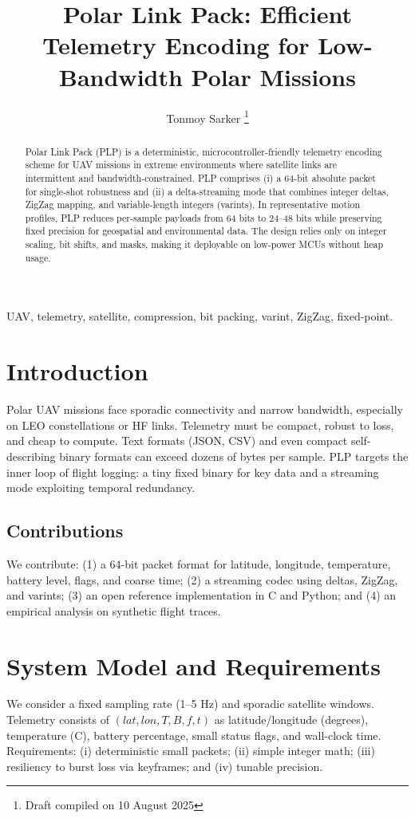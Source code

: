 \documentclass[conference]{IEEEtran}
\title{Polar Link Pack: Efficient Telemetry Encoding for Low-Bandwidth Polar Missions}
\author{Tonmoy Sarker \thanks{Draft compiled on 10 August 2025}}
\begin{document}
\maketitle
\begin{abstract}
Polar Link Pack (PLP) is a deterministic, microcontroller-friendly telemetry encoding scheme for UAV missions in extreme environments where satellite links are intermittent and bandwidth-constrained. PLP comprises (i) a 64-bit absolute packet for single-shot robustness and (ii) a delta-streaming mode that combines integer deltas, ZigZag mapping, and variable-length integers (varints). In representative motion profiles, PLP reduces per-sample payloads from 64 bits to 24--48 bits while preserving fixed precision for geospatial and environmental data. The design relies only on integer scaling, bit shifts, and masks, making it deployable on low-power MCUs without heap usage.
\end{abstract}
\begin{IEEEkeywords}
UAV, telemetry, satellite, compression, bit packing, varint, ZigZag, fixed-point.
\end{IEEEkeywords}
\section{Introduction}
Polar UAV missions face sporadic connectivity and narrow bandwidth, especially on LEO constellations or HF links. Telemetry must be compact, robust to loss, and cheap to compute. Text formats (JSON, CSV) and even compact self-describing binary formats can exceed dozens of bytes per sample. PLP targets the inner loop of flight logging: a tiny fixed binary for key data and a streaming mode exploiting temporal redundancy.
\subsection{Contributions}
We contribute: (1) a 64-bit packet format for latitude, longitude, temperature, battery level, flags, and coarse time; (2) a streaming codec using deltas, ZigZag, and varints; (3) an open reference implementation in C and Python; and (4) an empirical analysis on synthetic flight traces.
\section{System Model and Requirements}
We consider a fixed sampling rate (1--5 Hz) and sporadic satellite windows. Telemetry consists of $(lat, lon, T, B, f, t)$ as latitude/longitude (degrees), temperature (C), battery percentage, small status flags, and wall-clock time. Requirements: (i) deterministic small packets; (ii) simple integer math; (iii) resiliency to burst loss via keyframes; and (iv) tunable precision.
\end{document}
